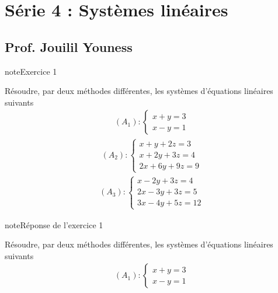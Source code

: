 \documentclass[letterpaper,10pt,french]{jupyterBook}
\begin{document}
\chapter{Série 4 : Systèmes linéaires}
\label{\detokenize{S_xe9rie4:serie-4-systemes-lineaires}}\label{\detokenize{S_xe9rie4::doc}}

\section{Prof. Jouilil Youness}
\label{\detokenize{S_xe9rie4:prof-jouilil-youness}}
\begin{sphinxadmonition}{note}{Exercice 1}

\sphinxAtStartPar
Résoudre, par deux méthodes différentes, les systèmes d’équations linéaires suivants
\begin{equation*}
\begin{split}
(A_1) : \left\{
\begin{array}{l}
x + y = 3 \\
x - y  = 1
\end{array}
\right.
\end{split}
\end{equation*}\begin{equation*}
\begin{split}
(A_2) : \left\{
\begin{array}{l}
x + y + 2z = 3 \\
x + 2y + 3z = 4 \\
2x + 6y + 9z = 9
\end{array}
\right.
\end{split}
\end{equation*}\begin{equation*}
\begin{split}
(A_3) : \left\{
\begin{array}{l}
x - 2y + 3z = 4 \\
2x - 3y + 3z = 5 \\
3x - 4y + 5z = 12
\end{array}
\right.
\end{split}
\end{equation*}\end{sphinxadmonition}

\begin{sphinxadmonition}{note}{Réponse de l’exercice 1}

\sphinxAtStartPar
Résoudre, par deux méthodes différentes, les systèmes d’équations linéaires suivants
\begin{equation*}
\begin{split}
(A_1) : \left\{
\begin{array}{l}
x + y = 3 \\
x - y  = 1
\end{array}
\right.
\end{split}
\end{equation*}\end{sphinxadmonition}
\end{document}
